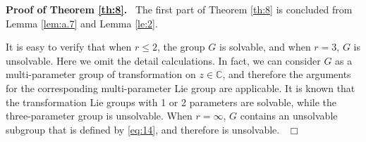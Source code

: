 \documentclass[preprint, 12pt]{elsarticle}
\numberwithin{equation}{section}
\newenvironment{proof}[1][Proof]{\textbf{#1.}\ }{\ $\Box$}
\newcommand{\Comp}{\mathbb{C}}
\begin{document}
\begin{proof}[Proof of Theorem \ref{th:8}]
The first part of Theorem \ref{th:8} is concluded from Lemma \ref{lem:a.7}
and Lemma \ref{le:2}.

It is easy to verify that when $r\leq 2$, the group $G$ is solvable, and when $r = 3$, $G$ is unsolvable.  Here we omit the detail calculations. In fact, we can consider $G$ as a multi-parameter group of transformation on $z\in \Comp$, and therefore the arguments for the corresponding multi-parameter Lie group are applicable. It is known that the transformation Lie groups with 1 or 2 parameters are solvable, while the three-parameter group is unsolvable\cite[pp. 85-86]{Blu:89}.  When $r=\infty$, $G$ contains an unsolvable subgroup that is defined by \eqref{eq:14}, and therefore is unsolvable.  
\end{proof}
\end{document}
